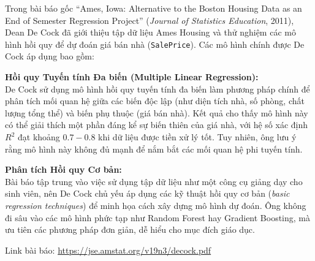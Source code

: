 


Trong bài báo gốc ``Ames, Iowa: Alternative to the Boston Housing Data as an End of Semester Regression Project'' (\textit{Journal of Statistics Education}, 2011), Dean De Cock đã giới thiệu tập dữ liệu Ames Housing và thử nghiệm các mô hình hồi quy để dự đoán giá bán nhà (\texttt{SalePrice}). Các mô hình chính được De Cock áp dụng bao gồm:

\textbf{Hồi quy Tuyến tính Đa biến (Multiple Linear Regression):} \\
De Cock sử dụng mô hình hồi quy tuyến tính đa biến làm phương pháp chính để phân tích mối quan hệ giữa các biến độc lập (như diện tích nhà, số phòng, chất lượng tổng thể) và biến phụ thuộc (giá bán nhà). Kết quả cho thấy mô hình này có thể giải thích một phần đáng kể sự biến thiên của giá nhà, với hệ số xác định $R^2$ đạt khoảng $0.7-0.8$ khi dữ liệu được tiền xử lý tốt. Tuy nhiên, ông lưu ý rằng mô hình này không đủ mạnh để nắm bắt các mối quan hệ phi tuyến tính.

\textbf{Phân tích Hồi quy Cơ bản:} \\
Bài báo tập trung vào việc sử dụng tập dữ liệu như một công cụ giảng dạy cho sinh viên, nên De Cock chủ yếu áp dụng các kỹ thuật hồi quy cơ bản (\textit{basic regression techniques}) để minh họa cách xây dựng mô hình dự đoán. Ông không đi sâu vào các mô hình phức tạp như Random Forest hay Gradient Boosting, mà ưu tiên các phương pháp đơn giản, dễ hiểu cho mục đích giáo dục.

Link bài báo: \url{https://jse.amstat.org/v19n3/decock.pdf}
